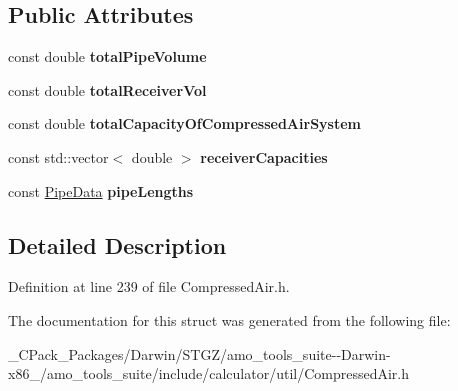 \subsection*{Public Attributes}
\begin{DoxyCompactItemize}
\item 
\mbox{\label{struct_compressor_1_1_air_system_capacity_1_1_output_aa6eebf63d38ed5cb2943e6ef0d00d326}} 
const double {\bfseries total\+Pipe\+Volume}
\item 
\mbox{\label{struct_compressor_1_1_air_system_capacity_1_1_output_a442171a72537e1c9057f03db3f08a39a}} 
const double {\bfseries total\+Receiver\+Vol}
\item 
\mbox{\label{struct_compressor_1_1_air_system_capacity_1_1_output_a9f81c36e0dfea5574d2e6279b928e288}} 
const double {\bfseries total\+Capacity\+Of\+Compressed\+Air\+System}
\item 
\mbox{\label{struct_compressor_1_1_air_system_capacity_1_1_output_a4636965433b7e3c0fa5ef6d2a69a32ba}} 
const std\+::vector$<$ double $>$ {\bfseries receiver\+Capacities}
\item 
\mbox{\label{struct_compressor_1_1_air_system_capacity_1_1_output_a1a2fe0406a4ff682d7141df7b5e4b150}} 
const \hyperlink{struct_compressor_1_1_pipe_data}{Pipe\+Data} {\bfseries pipe\+Lengths}
\end{DoxyCompactItemize}


\subsection{Detailed Description}


Definition at line 239 of file Compressed\+Air.\+h.



The documentation for this struct was generated from the following file\+:\begin{DoxyCompactItemize}
\item 
\+\_\+\+C\+Pack\+\_\+\+Packages/\+Darwin/\+S\+T\+G\+Z/amo\+\_\+tools\+\_\+suite-\/-\/\+Darwin-\/x86\+\_/amo\+\_\+tools\+\_\+suite/include/calculator/util/Compressed\+Air.\+h\end{DoxyCompactItemize}
